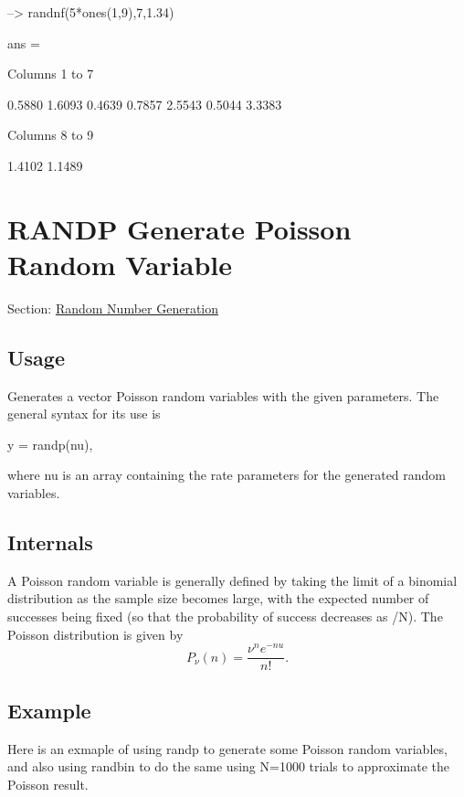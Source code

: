 \begin{DoxyVerbInclude}
--> randnf(5*ones(1,9),7,1.34)

ans = 

 Columns 1 to 7

    0.5880    1.6093    0.4639    0.7857    2.5543    0.5044    3.3383 

 Columns 8 to 9

    1.4102    1.1489 
\end{DoxyVerbInclude}
 \hypertarget{random_randp}{}\section{R\-A\-N\-D\-P Generate Poisson Random Variable}\label{random_randp}
Section\-: \hyperlink{sec_random}{Random Number Generation} \hypertarget{vtkwidgets_vtkxyplotwidget_Usage}{}\subsection{Usage}\label{vtkwidgets_vtkxyplotwidget_Usage}
Generates a vector Poisson random variables with the given parameters. The general syntax for its use is \begin{DoxyVerb}   y = randp(nu),
\end{DoxyVerb}
 where {\ttfamily nu} is an array containing the rate parameters for the generated random variables. \hypertarget{transforms_svd_Function}{}\subsection{Internals}\label{transforms_svd_Function}
A Poisson random variable is generally defined by taking the limit of a binomial distribution as the sample size becomes large, with the expected number of successes being fixed (so that the probability of success decreases as {/\-N}). The Poisson distribution is given by \[ P_{\nu}(n) = \frac{\nu^n e^{-nu}}{n!}. \] \hypertarget{variables_struct_Example}{}\subsection{Example}\label{variables_struct_Example}
Here is an exmaple of using {\ttfamily randp} to generate some Poisson random variables, and also using {\ttfamily randbin} to do the same using {\ttfamily N=1000} trials to approximate the Poisson result.


